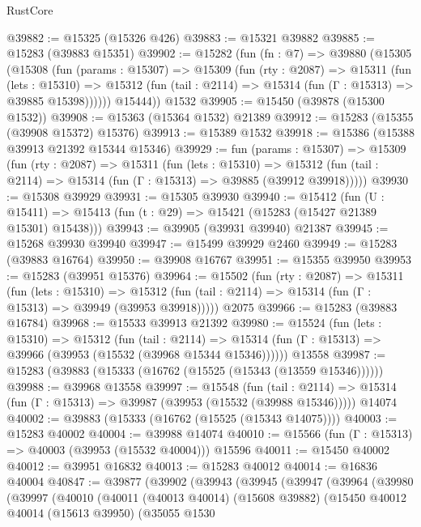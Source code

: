 \begin{lexlean}{RustCore}
\begin{coremodule}
@39882 := @15325 (@15326 @426)
@39883 := @15321 @39882
@39885 := @15283 (@39883 @15351)
@39902 := @15282
    (fun (fn : @7) =>
    @39880
      (@15305
        (@15308
          (fun (params : @15307) =>
          @15309
            (fun (rty : @2087) =>
            @15311
              (fun (lets : @15310) =>
              @15312 (fun (tail : @2114) => @15314 (fun (Γ : @15313) => @39885 @15398))))))
        @15444))
    @1532
@39905 := @15450 (@39878 (@15300 @1532))
@39908 := @15363 (@15364 @1532) @21389
@39912 := @15283 (@15355 (@39908 @15372) @15376)
@39913 := @15389 @1532
@39918 := @15386 (@15388 @39913 @21392 @15344 @15346)
@39929 := fun (params : @15307) =>
  @15309
    (fun (rty : @2087) =>
    @15311
      (fun (lets : @15310) =>
      @15312 (fun (tail : @2114) => @15314 (fun (Γ : @15313) => @39885 (@39912 @39918)))))
@39930 := @15308 @39929
@39931 := @15305 @39930
@39940 := @15412
    (fun (U : @15411) => @15413 (fun (t : @29) => @15421 (@15283 (@15427 @21389 @15301) @15438)))
@39943 := @39905 (@39931 @39940) @21387
@39945 := @15268 @39930 @39940
@39947 := @15499 @39929 @2460
@39949 := @15283 (@39883 @16764)
@39950 := @39908 @16767
@39951 := @15355 @39950
@39953 := @15283 (@39951 @15376)
@39964 := @15502
    (fun (rty : @2087) =>
    @15311
      (fun (lets : @15310) =>
      @15312 (fun (tail : @2114) => @15314 (fun (Γ : @15313) => @39949 (@39953 @39918)))))
    @2075
@39966 := @15283 (@39883 @16784)
@39968 := @15533 @39913 @21392
@39980 := @15524
    (fun (lets : @15310) =>
    @15312
      (fun (tail : @2114) =>
      @15314 (fun (Γ : @15313) => @39966 (@39953 (@15532 (@39968 @15344 @15346))))))
    @13558
@39987 := @15283 (@39883 (@15333 (@16762 (@15525 (@15343 (@13559 @15346))))))
@39988 := @39968 @13558
@39997 := @15548
    (fun (tail : @2114) => @15314 (fun (Γ : @15313) => @39987 (@39953 (@15532 (@39988 @15346)))))
    @14074
@40002 := @39883 (@15333 (@16762 (@15525 (@15343 @14075))))
@40003 := @15283 @40002
@40004 := @39988 @14074
@40010 := @15566 (fun (Γ : @15313) => @40003 (@39953 (@15532 @40004))) @15596
@40011 := @15450 @40002
@40012 := @39951 @16832
@40013 := @15283 @40012
@40014 := @16836 @40004
@40847 := @39877
    (@39902
      (@39943
        (@39945
          (@39947
            (@39964
              (@39980
                (@39997
                  (@40010
                    (@40011
                      (@40013 @40014)
                      (@15608 @39882)
                      (@15450
                        @40012
                        @40014
                        (@15613 @39950)
                        (@35055
                          @1530

\end{coremodule}
\end{lexlean}
